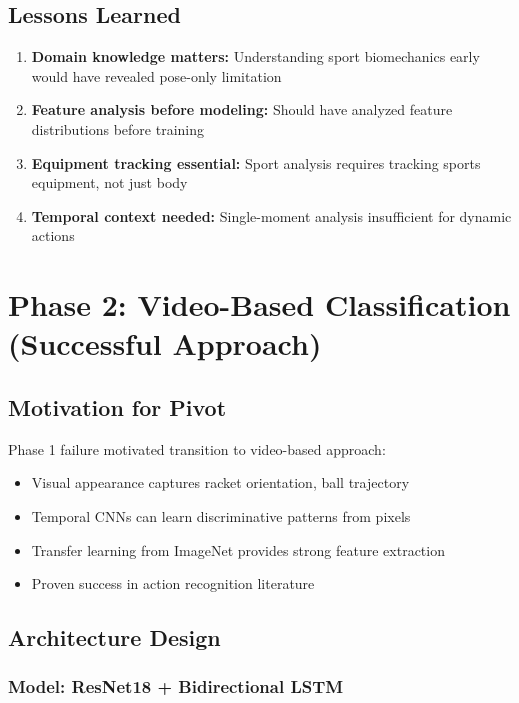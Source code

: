 \documentclass[12pt,a4paper]{article}
\begin{document}
\subsection{Lessons Learned}

\begin{enumerate}
\item \textbf{Domain knowledge matters:} Understanding sport biomechanics early would have revealed pose-only limitation
\item \textbf{Feature analysis before modeling:} Should have analyzed feature distributions before training
\item \textbf{Equipment tracking essential:} Sport analysis requires tracking sports equipment, not just body
\item \textbf{Temporal context needed:} Single-moment analysis insufficient for dynamic actions
\end{enumerate}

\section{Phase 2: Video-Based Classification (Successful Approach)}

\subsection{Motivation for Pivot}

Phase 1 failure motivated transition to video-based approach:
\begin{itemize}
\item Visual appearance captures racket orientation, ball trajectory
\item Temporal CNNs can learn discriminative patterns from pixels
\item Transfer learning from ImageNet provides strong feature extraction
\item Proven success in action recognition literature
\end{itemize}

\subsection{Architecture Design}

\subsubsection{Model: ResNet18 + Bidirectional LSTM}
\end{document}
